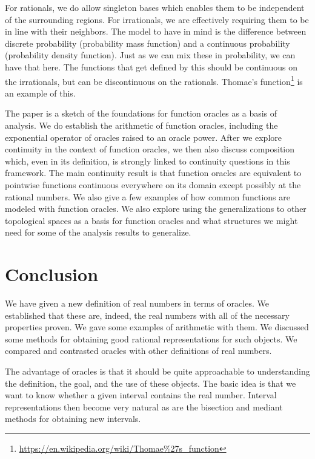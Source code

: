 \documentclass[12pt]{article}
\begin{document}
For rationals, we do allow singleton bases which enables them to be independent of the surrounding regions. For irrationals, we are effectively requiring them to be in line with their neighbors. The model to have in mind is the difference between discrete probability (probability mass function) and a continuous probability (probability density function). Just as we can mix these in probability, we can have that here. The functions that get defined by this should be continuous on the irrationals, but can be discontinuous on the rationals. Thomae's function\footnote{\url{https://en.wikipedia.org/wiki/Thomae\%27s_function}} is an example of this. 

The paper is a sketch of the foundations for function oracles as a basis of analysis. We do establish the arithmetic of function oracles, including the exponential operator of oracles raised to an oracle power. After we explore continuity in the context of function oracles, we then also discuss composition which, even in its definition, is strongly linked to continuity questions in this framework. The main continuity result is that function oracles are equivalent to pointwise functions continuous everywhere on its domain except possibly at the rational numbers. We also give a few examples of how common functions are modeled with function oracles. We also explore using the generalizations to other topological spaces as a basis for function oracles and what structures we might need for some of the analysis results to generalize.


\section{Conclusion}





We have given a new definition of real numbers in terms of oracles. We established that these are, indeed, the real numbers with all of the necessary properties proven. We gave some examples of arithmetic with them. We discussed some methods for obtaining good rational representations for such objects.  We compared and contrasted oracles with other definitions of real numbers. 

The advantage of oracles is that it should be quite approachable to understanding the definition, the goal, and the use of these objects. The basic idea is that we want to know whether a given interval contains the real number. Interval representations then become very natural as are the bisection and mediant methods for obtaining new intervals. 
\end{document}
